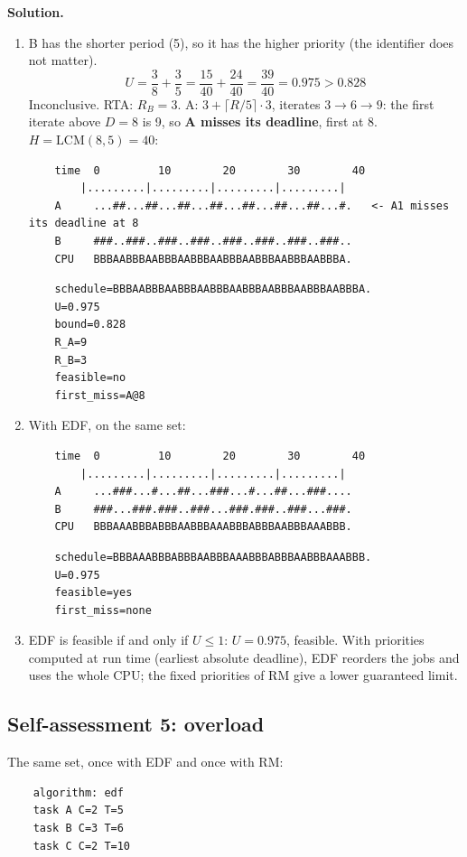 \textbf{Solution.}
\begin{enumerate}
    \item B has the shorter period (5), so it has the higher priority (the identifier does not matter).
    \[
    U = \frac{3}{8} + \frac{3}{5} = \frac{15}{40} + \frac{24}{40} = \frac{39}{40} = 0.975 > 0.828
    \]
    Inconclusive. RTA: $R_B = 3$. A: $3 + \lceil R/5 \rceil \cdot 3$, iterates $3 \to 6 \to 9$: the first iterate above $D = 8$ is 9, so \textbf{A misses its deadline}, first at 8. $H = \mathrm{LCM}(8, 5) = 40$:

    \begin{verbatim}
    time  0         10        20        30        40
        |.........|.........|.........|.........|
    A     ...##...##...##...##...##...##...##...#.   <- A1 misses its deadline at 8
    B     ###..###..###..###..###..###..###..###..
    CPU   BBBAABBBAABBBAABBBAABBBAABBBAABBBAABBBA.
\end{verbatim}
\begin{verbatim}
    schedule=BBBAABBBAABBBAABBBAABBBAABBBAABBBAABBBA.
    U=0.975
    bound=0.828
    R_A=9
    R_B=3
    feasible=no
    first_miss=A@8
\end{verbatim}
    \item With EDF, on the same set:
\begin{verbatim}
    time  0         10        20        30        40
        |.........|.........|.........|.........|
    A     ...###...#...##...###...#...##...###....
    B     ###...###.###..###...###.###..###...###.
    CPU   BBBAAABBBABBBAABBBAAABBBABBBAABBBAAABBB.
\end{verbatim}
\begin{verbatim}
    schedule=BBBAAABBBABBBAABBBAAABBBABBBAABBBAAABBB.
    U=0.975
    feasible=yes
    first_miss=none
\end{verbatim}
    \item EDF is feasible if and only if $U \le 1$: $U = 0.975$, feasible. With priorities computed at run time (earliest absolute deadline), EDF reorders the jobs and uses the whole CPU; the fixed priorities of RM give a lower guaranteed limit.
\end{enumerate}

\subsection*{Self-assessment 5: overload}
The same set, once with EDF and once with RM:
\begin{lstlisting}
    algorithm: edf
    task A C=2 T=5
    task B C=3 T=6
    task C C=2 T=10
\end{lstlisting}


